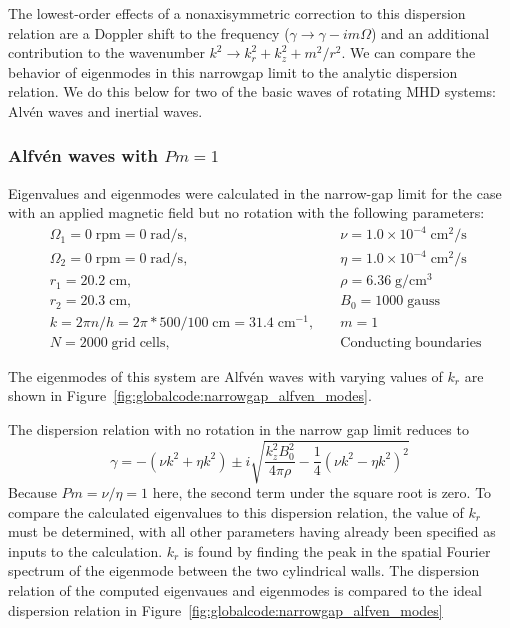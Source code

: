 \documentclass[letterpaper]{article}
\begin{document}
The lowest-order effects of a nonaxisymmetric correction to this
dispersion relation are a Doppler shift to the frequency ($\gamma
\rightarrow \gamma - im\Omega$) and an additional contribution to the
wavenumber $k^2 \rightarrow k_r^2 + k_z^2 + m^2/r^2$. We can compare the
behavior of eigenmodes in this narrowgap limit to the analytic
dispersion relation. We do this below for two of the basic waves of
rotating MHD systems: Alv\'en waves and inertial waves.

\subsubsection{Alfv\'en waves with $Pm=1$}

Eigenvalues and eigenmodes were calculated in the narrow-gap limit for
the case with an applied magnetic field but no rotation with the
following parameters:
\begin{align*}
&\Omega_1 = 0\;\mathrm{rpm} = 0\;\mathrm{rad/s},\quad
    &\nu = 1.0\times10^{-4}\;\mathrm{cm^2/s}
\\
&\Omega_2 = 0\;\mathrm{rpm} = 0\;\mathrm{rad/s},\quad
    &\eta = 1.0\times10^{-4}\;\mathrm{cm^2/s}
\\
&r_1 = 20.2\;\mathrm{cm},\quad &\rho = 6.36\;\mathrm{g/cm^3}
\\
&r_2 = 20.3\;\mathrm{cm},\quad &B_0 = 1000\; \mathrm{gauss}
\\
&k = 2\pi n/h = 2\pi*500/100\;\mathrm{cm} = 31.4\;\mathrm{cm^{-1}},\quad
    &m=1
\\
&N = 2000\;\mathrm{grid\;cells},\quad &\mathrm{Conducting\;boundaries}
\end{align*}

The eigenmodes of this system are Alfv\'en waves with varying values
of $k_r$ are shown in
Figure~\ref{fig:globalcode:narrowgap_alfven_modes}.

The dispersion relation with no rotation in the narrow gap limit reduces to
\begin{equation}
\gamma = -(\nu k^2 + \eta k^2) 
         \pm i\sqrt{\frac{k_z^2B_0^2}{4\pi\rho} 
                    - \frac{1}{4}\left(\nu k^2 - \eta k^2\right)^2}
\label{eqn:globalcode:alfven_wave_dr}
\end{equation}
Because $Pm=\nu/\eta=1$ here, the second term under the square root is
zero. To compare the calculated eigenvalues to this dispersion
relation, the value of $k_r$ must be determined, with all other
parameters having already been specified as inputs to the
calculation. $k_r$ is found by finding the peak in the spatial Fourier
spectrum of the eigenmode between the two cylindrical walls. The dispersion relation of the computed eigenvaues and eigenmodes is compared to the ideal dispersion relation in Figure~\ref{fig:globalcode:narrowgap_alfven_modes}
\end{document}
